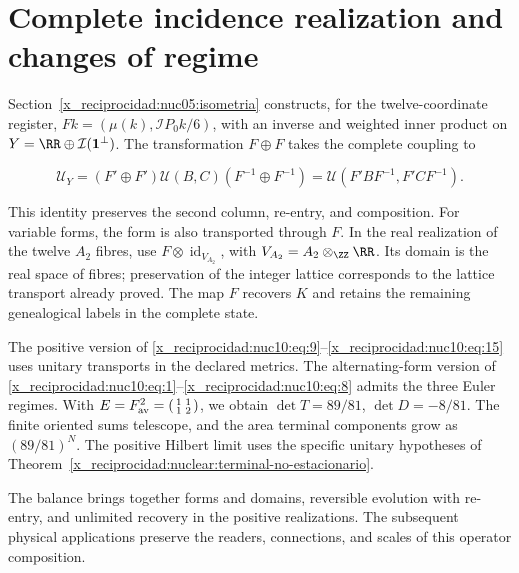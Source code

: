 \section{Complete incidence realization and changes of regime}

Section~\ref{x_reciprocidad:nuc05:isometria} constructs, for the twelve-coordinate register, \(Fk=(\mu(k),\mathcal IP_0k/6)\), with an inverse and weighted inner product on \(Y=\RR\oplus\mathcal I(\mathbf1^\perp)\). The transformation \(F\oplus F\) takes the complete coupling to



\begin{equation}
\mathcal U_Y=(F'\oplus F')\mathcal U(B,C)(F^{-1}\oplus F^{-1})
=\mathcal U(F'BF^{-1},F'CF^{-1}).
\label{x_reciprocidad:nuc10:eq:16}
\end{equation}



This identity preserves the second column, re-entry, and composition. For variable forms, the form is also transported through \(F\). In the real realization of the twelve \(A_2\) fibres, use \(F\otimes\operatorname{id}_{V_{A_2}}\), with \(V_{A_2}=A_2\otimes_{\ZZ}\RR\). Its domain is the real space of fibres; preservation of the integer lattice corresponds to the lattice transport already proved. The map \(F\) recovers \(K\) and retains the remaining genealogical labels in the complete state.

The positive version of \eqref{x_reciprocidad:nuc10:eq:9}–\eqref{x_reciprocidad:nuc10:eq:15} uses unitary transports in the declared metrics. The alternating-form version of \eqref{x_reciprocidad:nuc10:eq:1}–\eqref{x_reciprocidad:nuc10:eq:8} admits the three Euler regimes. With \(E=F_{\rm av}^2=\left(\begin{smallmatrix}1&1\\1&2\end{smallmatrix}\right)\), we obtain \(\det T=89/81\), \(\det D=-8/81\). The finite oriented sums telescope, and the area terminal components grow as \((89/81)^N\). The positive Hilbert limit uses the specific unitary hypotheses of Theorem~\ref{x_reciprocidad:nuclear:terminal-no-estacionario}.

The balance brings together forms and domains, reversible evolution with re-entry, and unlimited recovery in the positive realizations. The subsequent physical applications preserve the readers, connections, and scales of this operator composition.

